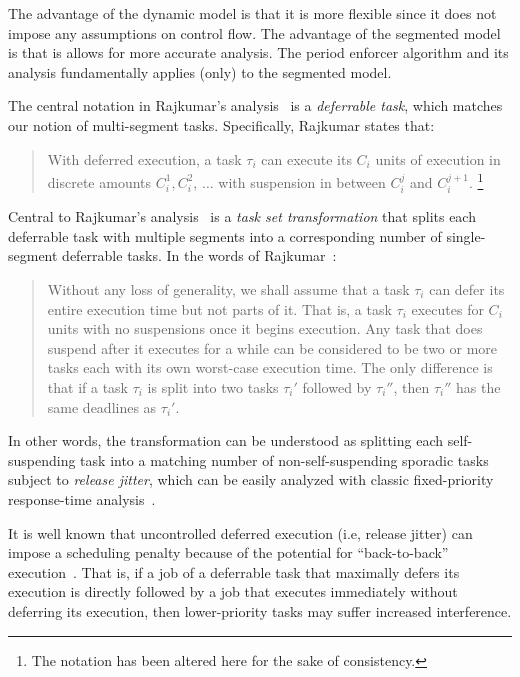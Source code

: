 The advantage of the dynamic model is that it is more flexible since it does not impose any assumptions on control flow. The advantage of the segmented model is that is allows for more accurate analysis. The period enforcer algorithm and its analysis fundamentally applies (only) to the segmented model.

The central notation in Rajkumar's analysis~\cite{Raj:suspension1991} is a \emph{deferrable task}, which matches our notion of multi-segment tasks.  Specifically, Rajkumar states that:
\begin{quote}
With deferred execution, a task $\tau_i$ can execute its $C_i$ units of execution in discrete amounts $C_i^1, C_i^2$, $\ldots$ with suspension in between $C_i^j$ and $C_i^{j+1}$. \cite[Section 3]{Raj:suspension1991}\footnote{The notation has been altered here for the sake of consistency.} 
\end{quote}
%
Central to Rajkumar's analysis~\cite{Raj:suspension1991} is a \emph{task set transformation} that splits each deferrable task with multiple segments into a corresponding number of single-segment deferrable tasks.  In the words of Rajkumar~\cite[Section 3]{Raj:suspension1991}:

\begin{quote}
	 Without any loss of generality, we shall assume that a task $\tau_i$ can defer its entire execution time but not parts of it. That is, a task $\tau_i$ executes for $C_i$ units with no suspensions once it begins execution. Any task that does suspend after it executes for a while can be considered to be two or more tasks each with its own worst-case execution time. The only difference is that if a task $\tau_i$ is split into two tasks $\tau_i'$ followed by $\tau_i''$, then $\tau_i''$ has the same deadlines as $\tau_i{{'}}$. 
\end{quote}
%
In other words, the transformation can be understood as splitting each self-suspending task into a matching number of non-self-suspending sporadic tasks subject to \emph{release jitter}, which can be easily analyzed with classic fixed-priority response-time analysis~\cite{ABRTW:93}.

It is well known that uncontrolled deferred execution (i.e, release jitter) can impose a scheduling penalty because of the potential for ``back-to-back'' execution~\cite{ABRTW:93}. That is, if a job of a deferrable task that maximally defers its execution is directly followed by a job that executes immediately without deferring its execution, then lower-priority tasks may suffer increased interference. 

